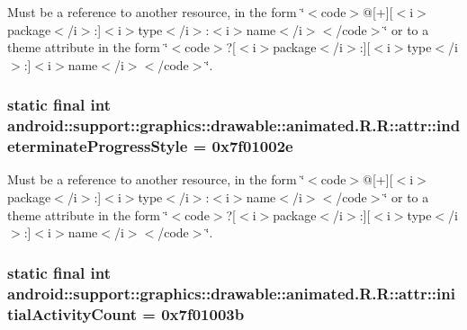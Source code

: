 Must be a reference to another resource, in the form \char`\"{}$<$code$>$@\mbox{[}+\mbox{]}\mbox{[}$<$i$>$package$<$/i$>$:\mbox{]}$<$i$>$type$<$/i$>$:$<$i$>$name$<$/i$>$$<$/code$>$\char`\"{} or to a theme attribute in the form \char`\"{}$<$code$>$?\mbox{[}$<$i$>$package$<$/i$>$:\mbox{]}\mbox{[}$<$i$>$type$<$/i$>$:\mbox{]}$<$i$>$name$<$/i$>$$<$/code$>$\char`\"{}. \hypertarget{classandroid_1_1support_1_1graphics_1_1drawable_1_1animated_1_1_r_1_1attr_1d46676f0a008eaa65d55e51055982f6}{
\subsubsection[{indeterminateProgressStyle}]{\setlength{\rightskip}{0pt plus 5cm}static final int android::support::graphics::drawable::animated.R.R::attr::indeterminateProgressStyle = 0x7f01002e}}
\label{classandroid_1_1support_1_1graphics_1_1drawable_1_1animated_1_1_r_1_1attr_1d46676f0a008eaa65d55e51055982f6}


Must be a reference to another resource, in the form \char`\"{}$<$code$>$@\mbox{[}+\mbox{]}\mbox{[}$<$i$>$package$<$/i$>$:\mbox{]}$<$i$>$type$<$/i$>$:$<$i$>$name$<$/i$>$$<$/code$>$\char`\"{} or to a theme attribute in the form \char`\"{}$<$code$>$?\mbox{[}$<$i$>$package$<$/i$>$:\mbox{]}\mbox{[}$<$i$>$type$<$/i$>$:\mbox{]}$<$i$>$name$<$/i$>$$<$/code$>$\char`\"{}. \hypertarget{classandroid_1_1support_1_1graphics_1_1drawable_1_1animated_1_1_r_1_1attr_456318c741fb6c3e3e057f9dcda5a911}{
\subsubsection[{initialActivityCount}]{\setlength{\rightskip}{0pt plus 5cm}static final int android::support::graphics::drawable::animated.R.R::attr::initialActivityCount = 0x7f01003b}}
\label{classandroid_1_1support_1_1graphics_1_1drawable_1_1animated_1_1_r_1_1attr_456318c741fb6c3e3e057f9dcda5a911}


